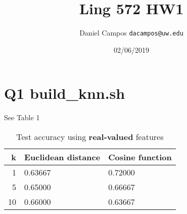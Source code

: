 \documentclass[11pt]{article}
\begin{document}
\title{Ling 572 HW1 }
\author{Daniel Campos  \tt {dacampos@uw.edu}}
\date{02/06/2019}
\maketitle 
\section{Q1 build\_knn.sh}
See Table 1
\begin{table}[h]
\centering
\caption{Test accuracy using {\bf real-valued} features} 
\label{table1}
\begin{tabular}{|r|l|l|} \hline
k  & Euclidean distance & Cosine function \\ \hline
1       & 0.63667  & 0.72000   \\ \hline
5       & 0.65000 & 0.66667   \\ \hline
10      & 0.66000 &  0.63667  \\ \hline
\end{tabular}
\end{table}
\end{document}
